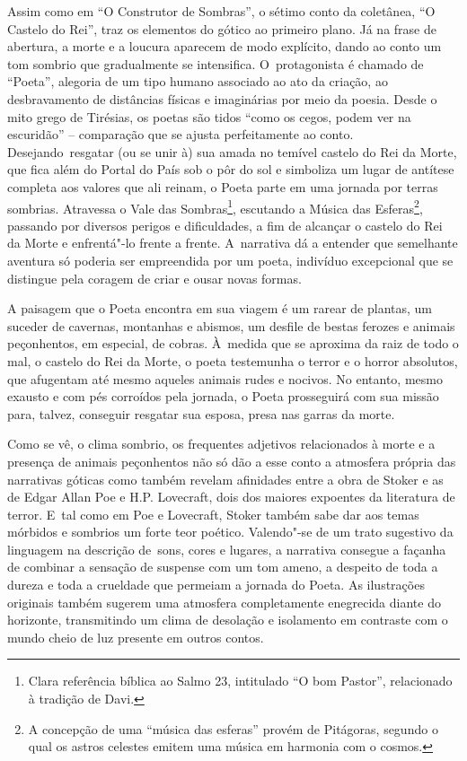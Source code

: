 Assim como em ``O Construtor de Sombras'', o sétimo conto da coletânea,
``O Castelo do Rei'', traz os elementos do gótico ao primeiro plano. Já
na frase de abertura, a morte e a loucura aparecem de modo explícito,
dando ao conto um tom sombrio que gradualmente se intensifica. O~protagonista é chamado de ``Poeta'', alegoria de um tipo humano
associado ao ato da criação, ao desbravamento de distâncias físicas e
imaginárias por meio da poesia. Desde o mito grego de Tirésias, os
poetas são tidos ``como os cegos, podem ver na escuridão'' -- comparação
que se ajusta perfeitamente ao conto. Desejando~resgatar (ou se unir à)
sua amada no temível castelo do Rei da Morte, que fica além do Portal do
País sob o pôr do sol e simboliza um lugar de antítese completa aos
valores que ali reinam, o Poeta parte em uma jornada por terras
sombrias. Atravessa o Vale das Sombras\footnote{Clara referência bíblica ao Salmo 23,
intitulado ``O bom Pastor'', relacionado à tradição de Davi.
},
escutando a Música das Esferas\footnote{A concepção de uma ``música das esferas''
provém de Pitágoras, segundo o qual os astros celestes emitem uma música
em harmonia com o cosmos.}, passando por
diversos perigos e dificuldades, a fim de alcançar o castelo do Rei da
Morte e enfrentá"-lo frente a frente. A~narrativa dá a entender que
semelhante aventura só poderia ser empreendida por um poeta, indivíduo
excepcional que se distingue pela coragem de criar e ousar novas formas.

A paisagem que o Poeta encontra em sua viagem é um rarear de plantas, um
suceder de cavernas, montanhas e abismos, um desfile de bestas ferozes e
animais peçonhentos, em especial, de cobras. À~medida que se aproxima da
raiz de todo o mal, o castelo do Rei da Morte, o poeta testemunha o
terror e o horror absolutos, que afugentam até mesmo aqueles animais
rudes e nocivos. No entanto, mesmo exausto e com pés corroídos pela
jornada, o Poeta prosseguirá com sua missão para, talvez, conseguir
resgatar sua esposa, presa nas garras da morte.

Como se vê, o clima sombrio, os frequentes adjetivos relacionados à
morte e a presença de animais peçonhentos não só dão a esse conto a
atmosfera própria das narrativas góticas como também revelam afinidades
entre a obra de Stoker e as de Edgar Allan Poe e H.P. Lovecraft, dois
dos maiores expoentes da literatura de terror. E~tal como em Poe e
Lovecraft, Stoker também sabe dar aos temas mórbidos e sombrios um forte
teor poético. Valendo"-se de um trato sugestivo da linguagem na descrição
de~sons, cores e lugares, a narrativa consegue a façanha de combinar a
sensação de suspense com um tom ameno, a despeito de toda a dureza e
toda a crueldade que permeiam a jornada do Poeta. As ilustrações
originais também sugerem uma atmosfera completamente enegrecida diante
do horizonte, transmitindo um clima de desolação e isolamento em
contraste com o mundo cheio de luz presente em outros contos.

